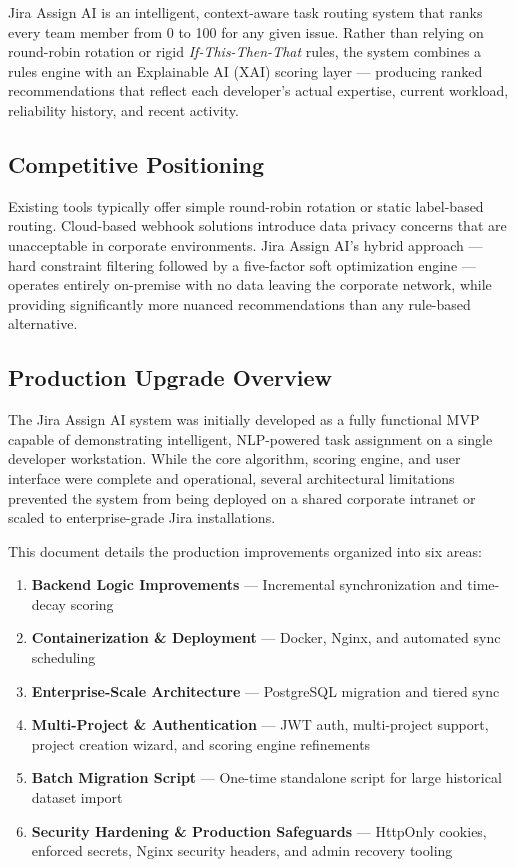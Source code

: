 \documentclass[12pt, a4paper]{article}
\begin{document}
Jira Assign AI is an intelligent, context-aware task routing system that ranks every team member from 0 to 100 for any given issue. Rather than relying on round-robin rotation or rigid \textit{If-This-Then-That} rules, the system combines a rules engine with an Explainable AI (XAI) scoring layer — producing ranked recommendations that reflect each developer's actual expertise, current workload, reliability history, and recent activity.

\subsection{Competitive Positioning}

Existing tools typically offer simple round-robin rotation or static label-based routing. Cloud-based webhook solutions introduce data privacy concerns that are unacceptable in corporate environments. Jira Assign AI's hybrid approach — hard constraint filtering followed by a five-factor soft optimization engine — operates entirely on-premise with no data leaving the corporate network, while providing significantly more nuanced recommendations than any rule-based alternative.

\subsection{Production Upgrade Overview}

The Jira Assign AI system was initially developed as a fully functional MVP capable of demonstrating intelligent, NLP-powered task assignment on a single developer workstation. While the core algorithm, scoring engine, and user interface were complete and operational, several architectural limitations prevented the system from being deployed on a shared corporate intranet or scaled to enterprise-grade Jira installations.

This document details the production improvements organized into six areas:

\begin{enumerate}
    \item \textbf{Backend Logic Improvements} — Incremental synchronization and time-decay scoring
    \item \textbf{Containerization \& Deployment} — Docker, Nginx, and automated sync scheduling
    \item \textbf{Enterprise-Scale Architecture} — PostgreSQL migration and tiered sync
    \item \textbf{Multi-Project \& Authentication} — JWT auth, multi-project support, project creation wizard, and scoring engine refinements
    \item \textbf{Batch Migration Script} — One-time standalone script for large historical dataset import
    \item \textbf{Security Hardening \& Production Safeguards} — HttpOnly cookies, enforced secrets, Nginx security headers, and admin recovery tooling
\end{enumerate}
\end{document}
